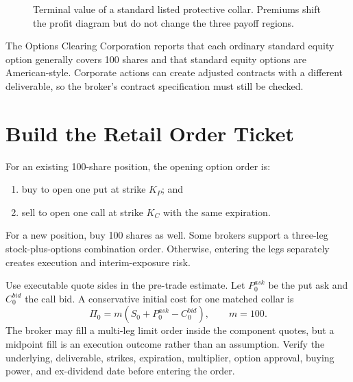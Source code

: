 \documentclass[11pt]{article}
\begin{document}
\begin{figure}[ht]
  \centering
  \caption{Terminal value of a standard listed protective collar. Premiums
  shift the profit diagram but do not change the three payoff regions.}
  \label{fig:collar-payoff}
\end{figure}

The Options Clearing Corporation reports that each ordinary standard equity
option generally covers 100 shares and that standard equity options are
American-style. Corporate actions can create adjusted contracts with a
different deliverable, so the broker's contract specification must still be
checked.

\section{Build the Retail Order Ticket}

For an existing 100-share position, the opening option order is:
\begin{enumerate}[leftmargin=1.5em,itemsep=2pt,topsep=3pt]
  \item buy to open one put at strike $K_P$; and
  \item sell to open one call at strike $K_C$ with the same expiration.
\end{enumerate}
For a new position, buy 100 shares as well. Some brokers support a three-leg
stock-plus-options combination order. Otherwise, entering the legs separately
creates execution and interim-exposure risk.

Use executable quote sides in the pre-trade estimate. Let $P_0^{ask}$ be the
put ask and $C_0^{bid}$ the call bid. A conservative initial cost for one
matched collar is
\begin{equation}
  \label{eq:initial-cost}
  \Pi_0=m\left(S_0+P_0^{ask}-C_0^{bid}\right),
  \qquad m=100.
\end{equation}
The broker may fill a multi-leg limit order inside the component quotes, but a
midpoint fill is an execution outcome rather than an assumption. Verify the
underlying, deliverable, strikes, expiration, multiplier, option approval,
buying power, and ex-dividend date before entering the order.
\end{document}
